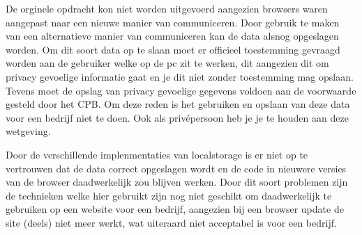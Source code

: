 De orginele opdracht kon niet worden uitgevoerd aangezien browsers waren aangepast naar een nieuwe manier van communiceren. Door gebruik te maken van een alternatieve manier van communiceren kan de data alsnog opgeslagen worden.
Om dit soort data op te slaan moet er officieel toestemming gevraagd worden aan de gebruiker welke op de pc zit te werken, dit aangezien dit om privacy gevoelige informatie gaat en je dit niet zonder toestemming mag opslaan. Tevens moet de opslag van privacy gevoelige gegevens voldoen aan de voorwaarde gesteld door het CPB. Om deze reden is het gebruiken en opslaan van deze data voor een bedrijf niet te doen. Ook als priv\'{e}persoon heb je je te houden aan deze wetgeving.

Door de verschillende implenmentaties van localstorage is er niet op te vertrouwen dat de data correct opgeslagen wordt en de code in nieuwere versies van de browser daadwerkelijk zou blijven werken. Door dit soort problemen zijn de technieken welke hier gebruikt zijn nog niet geschikt om daadwerkelijk te gebruiken op een website voor een bedrijf, aangezien bij een browser update de site (deels) niet meer werkt, wat uiteraard niet acceptabel is voor een bedrijf. 
